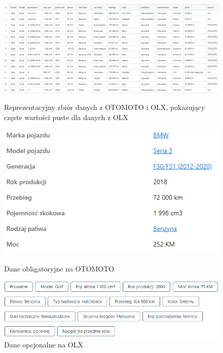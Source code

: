 \documentclass{article}
\begin{document}
\begin{figure}[H]
  \centering
  \begin{minipage}{1.0\textwidth}
    \centering
    \includegraphics[width=\textwidth]{images/reprezentacyjny_zbior_danych_OLX_OTOMOTO.png}
    \caption{Reprezentacyjny zbiór danych z OTOMOTO i OLX, pokazujący częste wartości puste dla danych z OLX}
  \end{minipage}\hfill
  \begin{minipage}{0.45\textwidth}
    \centering
    \includegraphics[width=\textwidth]{images/wycinek_danych_otomoto.png}
    \caption{Dane obligatoryjne na OTOMOTO}
  \end{minipage}\hfill
  \begin{minipage}{0.45\textwidth}
    \centering
    \includegraphics[width=\textwidth]{images/wycinek_danych_olx.png}
    \caption{Dane opcjonalne na OLX}
  \end{minipage}
\end{figure}
\end{document}
